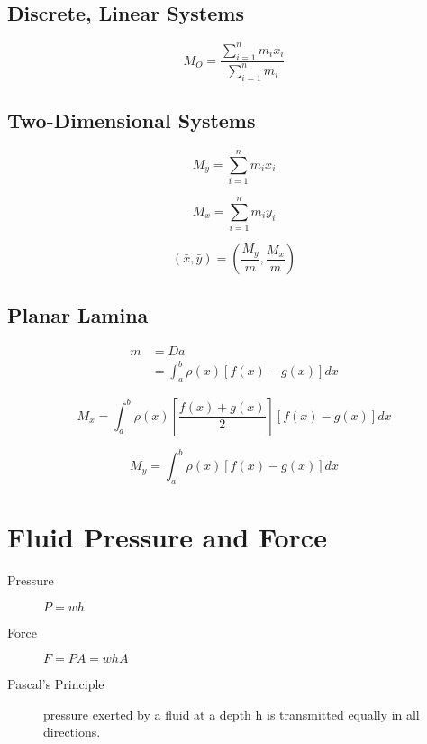 \subsection{Discrete, Linear Systems}
\begin{equation}
  M_O = \frac{\sum_{i=1}^{n} m_ix_i}{\sum_{i=1}^n m_i}
\end{equation}

\subsection{Two-Dimensional Systems}
\begin{equation}
  M_y = \sum_{i=1}^{n} m_ix_i
\end{equation}

\begin{equation}
  M_x = \sum_{i=1}^{n} m_iy_i
\end{equation}

\begin{equation}
  (\bar{x}, \bar{y}) = \left( \frac{M_y}{m}, \frac{M_x}{m} \right)
\end{equation}

\subsection{Planar Lamina}
\begin{align}
  m &= Da \\
    &= \int_a^b \rho(x)[f(x)-g(x)] dx
\end{align}

\begin{equation}
  M_x = \int_a^b \rho(x)\left[ \frac{f(x)+g(x)}{2} \right]\left[ f(x)-g(x) \right] dx
\end{equation}

\begin{equation}
  M_y = \int_a^b \rho(x)\left[ f(x)-g(x) \right] dx
\end{equation}

\section{Fluid Pressure and Force}
\begin{description}
  \item[Pressure] $P=wh$
  \item[Force] $F=PA=whA$
  \item[Pascal's Principle] pressure exerted by a fluid at a depth h is
    transmitted equally in all directions.
\end{description}
